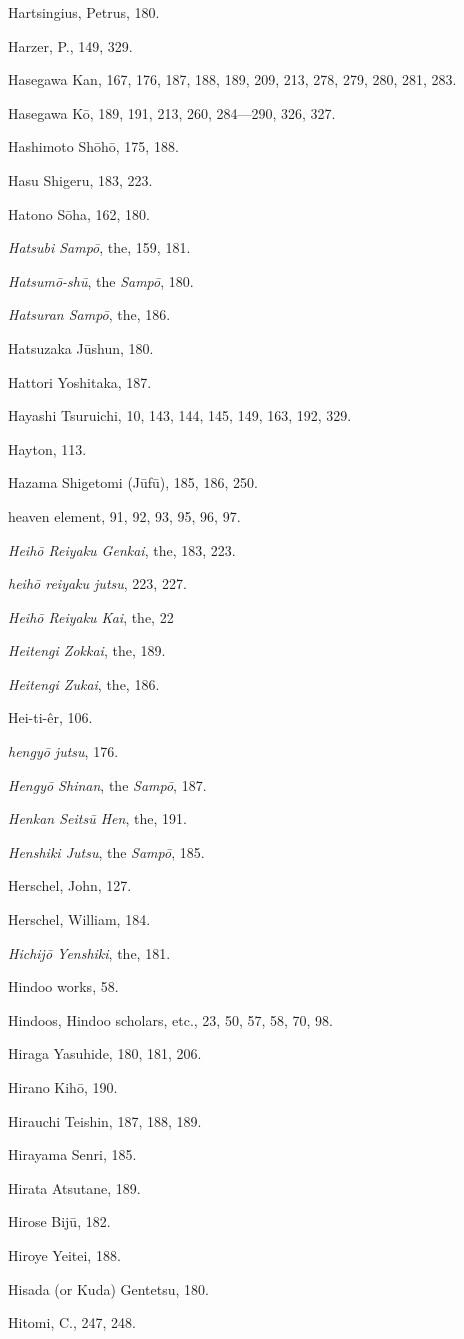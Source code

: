 \documentclass[11pt]{article}
\begin{document}
Hartsingius, Petrus, 180.\par
Harzer, P., 149, 329.\par
Hasegawa Kan, 167, 176, 187, 188, 189, 209, 213, 278, 279, 280, 281, 283.\par
Hasegawa Kō, 189, 191, 213, 260, 284---290, 326, 327.\par
Hashimoto Shōhō, 175, 188.\par
Hasu Shigeru, 183, 223.\par
Hatono Sōha, 162, 180.\par
\emph{Hatsubi Sampō}, the, 159, 181.\par
\emph{Hatsumō-shū}, the \emph{Sampō}, 180.\par
\emph{Hatsuran Sampō}, the, 186.\par
Hatsuzaka Jūshun, 180.\par
Hattori Yoshitaka, 187.\par
Hayashi Tsuruichi, 10, 143, 144, 145, 149, 163, 192, 329.\par
Hayton, 113.\par
Hazama Shigetomi (Jūfū), 185, 186, 250.\par
heaven element, 91, 92, 93, 95, 96, 97.\par
\emph{Heihō Reiyaku Genkai}, the, 183, 223.\par
\emph{heihō reiyaku jutsu}, 223, 227.\par
\emph{Heihō Reiyaku Kai}, the, 22\par
\emph{Heitengi Zokkai}, the, 189.\par
\emph{Heitengi Zukai}, the, 186.\par
Hei-ti-êr, 106.\par
\emph{hengyō jutsu}, 176.\par
\emph{Hengyō Shinan}, the \emph{Sampō}, 187.\par
\emph{Henkan Seitsū Hen}, the, 191.\par
\emph{Henshiki Jutsu}, the \emph{Sampō}, 185.\par
Herschel, John, 127.\par
Herschel, William, 184.\par
\emph{Hichijō Yenshiki}, the, 181.\par
Hindoo works, 58.\par
Hindoos, Hindoo scholars, etc., 23, 50, 57, 58, 70, 98.\par
Hiraga Yasuhide, 180, 181, 206.\par
Hirano Kihō, 190.\par
Hirauchi Teishin, 187, 188, 189.\par
Hirayama Senri, 185.\par
Hirata Atsutane, 189.\par
Hirose Bijū, 182.\par
Hiroye Yeitei, 188.\par
Hisada (or Kuda) Gentetsu, 180.\par
Hitomi, C., 247, 248.\par
\end{document}
